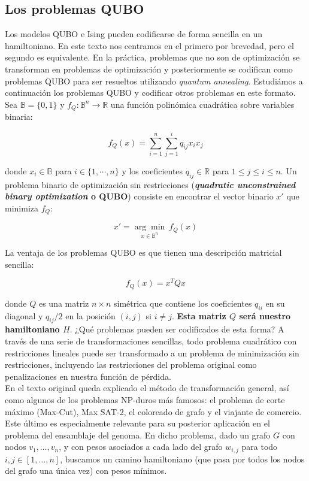 \documentclass[11pt]{article}
\newcommand*{\B}{\mathbb{B}}
\newcommand*{\R}{\mathbb{R}}
\begin{document}
\subsection{Los problemas QUBO}

Los modelos QUBO e Ising pueden codificarse de forma sencilla en un hamiltoniano. En este texto nos centramos en el primero por brevedad, pero el segundo es equivalente. En la práctica, problemas que no son de optimización se transforman en problemas de optimización y posteriormente se codifican como problemas QUBO para ser resueltos utilizando \emph{quantum annealing}. Estudiámos a continuación los problemas QUBO y codificar otros problemas en este formato. \\

Sea $\B = \{0,1\}$ y $f_Q: \B^n \longrightarrow \R $ una función polinómica cuadrática sobre variables binaria:

\[ f_Q(x) = \sum_{i=1}^n \sum_{j=1}^i q_{ij} x_i x_j \]

donde $x_i \in \B$ para $i \in \{1, \cdots, n\}$ y los coeficientes $q_{ij} \in \R$ para $1 \leq j \leq i \leq n$. Un problema binario de optimización sin restricciones (\textbf{\emph{quadratic unconstrained binary optimization} o QUBO}) consiste en encontrar el vector binario $x'$ que minimiza $f_Q$:

\[ x' = \underset {x \in \B^n }{\arg \min} ~ f_Q(x) \]

La ventaja de los problemas QUBO es que tienen una descripción matricial sencilla:

\[ f_Q(x) = x^T Q x \]

donde $Q$ es una matriz $n \times n$ simétrica que contiene los coeficientes $q_{ii}$ en su diagonal y $q_{ij} / 2$ en la posición $(i,j)$ si $i \neq j$. \textbf{Esta matriz $Q$ será nuestro hamiltoniano $H$}. ¿Qué problemas pueden ser codificados de esta forma? A través de una serie de transformaciones sencillas, todo problema cuadrático con restricciones lineales puede ser transformado a un problema de minimización sin restricciones, incluyendo las restricciones del problema original como penalizaciones en nuestra función de pérdida. \\

En el texto original queda explicado el método de transformación general, así como algunos de los problemas NP-duros más famosos: el problema de corte máximo (Max-Cut), Max SAT-2, el coloreado de grafo y el viajante de comercio. \\

Este último es especialmente relevante para su posterior aplicación en el problema del ensamblaje del genoma. En dicho problema, dado un grafo $G$ con nodos $v_1, \ldots, v_n$, y con pesos asociados a cada lado del grafo $w_{i,j}$ para todo $i,j \in [1, \ldots, n]$, buscamos un camino hamiltoniano (que pasa por todos los nodos del grafo una única vez) con pesos mínimos. \\
\end{document}
